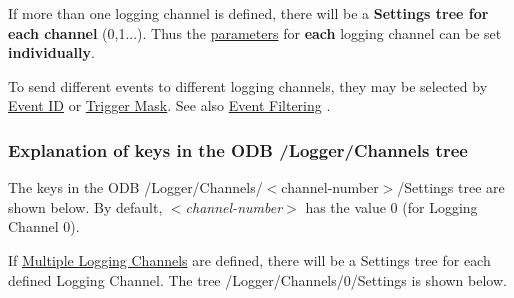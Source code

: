\begin{DoxyItemize}
\item If more than one logging channel is defined, there will be a {\bfseries Settings tree for each channel} (0,1...). Thus the \hyperlink{structparameters}{parameters} for {\bfseries each} logging channel can be set {\bfseries individually}.
\item To send different events to different logging channels, they may be selected by \hyperlink{F_Logging_Data_F_Logger_CS_Event_ID}{Event ID} or \hyperlink{F_Logging_Data_F_Logger_CS_Trigger_Mask}{Trigger Mask}. See also \hyperlink{F_Logging_Data_F_Logger_Event_Filtering}{Event Filtering} .
\end{DoxyItemize}\hypertarget{F_Logging_Data_F_Logger_Settings}{}\subsubsection{Explanation of keys in the ODB /Logger/Channels tree}\label{F_Logging_Data_F_Logger_Settings}
The keys in the ODB /Logger/Channels/$<$channel-\/number$>$/Settings  tree are shown below. By default, {\itshape  $<$channel-\/number$>$ \/} has the value 0 (for Logging Channel 0). \par
 If \hyperlink{F_Logging_Data_F_Logger_multiple_logging_channels}{Multiple Logging Channels} are defined, there will be a Settings tree for each defined Logging Channel. The tree /Logger/Channels/0/Settings is shown below.

\par


